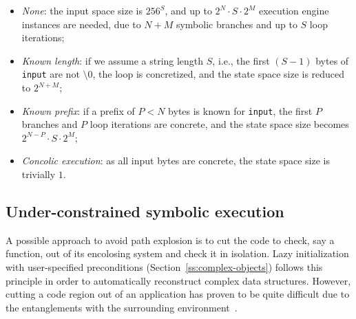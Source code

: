 \begin{itemize}
  \item {\em None}: the input space size is $256^S$, and up to $2^N\cdot S\cdot 2^M$ execution engine instances are needed, due to $N+M$ symbolic branches and up to $S$ loop iterations;
  \item {\em Known length}: if we assume a string length $S$, i.e., the first $(S-1)$ bytes of {\tt input} are not $\setminus0$, the loop is concretized, and the state space size is reduced to $2^{N+M}$;
  \item {\em Known prefix}: if a prefix of $P<N$ bytes is known for {\tt input}, the first $P$ branches and $P$ loop iterations are concrete, and the state space size becomes $2^{N-P}\cdot S\cdot 2^M$;
  \item {\em Concolic execution}: as all input bytes are concrete, the state space size is trivially $1$.
\end{itemize}





\subsection{Under-constrained symbolic execution} 
\label{under-constrained}

A possible approach to avoid path explosion is to cut the code to check, say a function, out of its encolosing system and check it in isolation. Lazy initialization with user-specified preconditions (Section~\ref{ss:complex-objects}) follows this principle in order to automatically reconstruct complex  data structures. However, cutting a code region out of an application has proven to be quite difficult due to the entanglements with the surrounding environment~\cite{ED-ISSTA07}.

